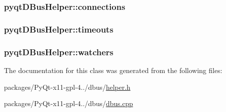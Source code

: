 \subsubsection[{connections}]{ pyqt\+D\+Bus\+Helper\+::connections}\label{classpyqtDBusHelper_aa69941e5b02975e4e6d3c9a4cc6cf9dc}
\hypertarget{classpyqtDBusHelper_adc620fa04632f1905432646cb2663b78}{}
\subsubsection[{timeouts}]{ pyqt\+D\+Bus\+Helper\+::timeouts}\label{classpyqtDBusHelper_adc620fa04632f1905432646cb2663b78}
\hypertarget{classpyqtDBusHelper_ad44628fa4d5ce7d89fcb12958575c4c9}{}
\subsubsection[{watchers}]{ pyqt\+D\+Bus\+Helper\+::watchers}\label{classpyqtDBusHelper_ad44628fa4d5ce7d89fcb12958575c4c9}


The documentation for this class was generated from the following files\+:\begin{DoxyCompactItemize}
\item 
packages/\+Py\+Qt-\/x11-\/gpl-\/4../dbus/\hyperlink{helper_8h}{helper.\+h}\item 
packages/\+Py\+Qt-\/x11-\/gpl-\/4../dbus/\hyperlink{dbus_8cpp}{dbus.\+cpp}\end{DoxyCompactItemize}
